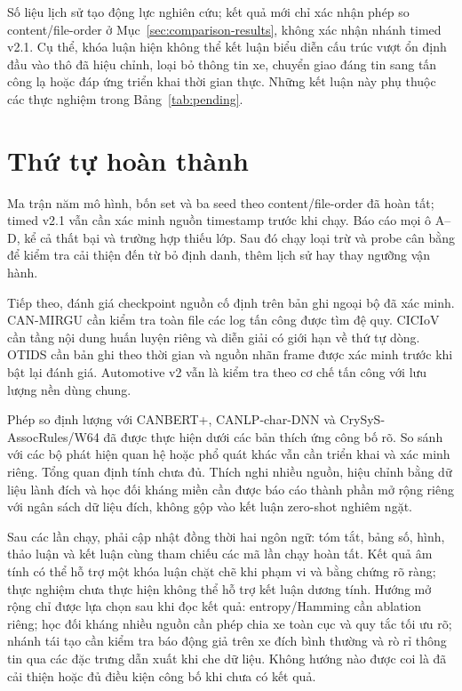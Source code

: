 \documentclass[12pt,a4paper,oneside,openany]{extbook}
\begin{document}
Số liệu lịch sử tạo động lực nghiên cứu; kết quả mới chỉ xác nhận phép so content/file-order ở Mục~\ref{sec:comparison-results}, không xác nhận nhánh timed v2.1. Cụ thể, khóa luận hiện không thể kết luận biểu diễn cấu trúc vượt ổn định đầu vào thô đã hiệu chỉnh, loại bỏ thông tin xe, chuyển giao đáng tin sang tấn công lạ hoặc đáp ứng triển khai thời gian thực. Những kết luận này phụ thuộc các thực nghiệm trong Bảng~\ref{tab:pending}.

\section{Thứ tự hoàn thành}
Ma trận năm mô hình, bốn set và ba seed theo content/file-order đã hoàn tất; timed v2.1 vẫn cần xác minh nguồn timestamp trước khi chạy. Báo cáo mọi ô A--D, kể cả thất bại và trường hợp thiếu lớp. Sau đó chạy loại trừ và probe cân bằng để kiểm tra cải thiện đến từ bỏ định danh, thêm lịch sử hay thay ngưỡng vận hành.

Tiếp theo, đánh giá checkpoint nguồn cố định trên bản ghi ngoại bộ đã xác minh. CAN-MIRGU cần kiểm tra toàn file các log tấn công được tìm đệ quy. CICIoV cần tầng nội dung huấn luyện riêng và diễn giải có giới hạn về thứ tự dòng. OTIDS cần bản ghi theo thời gian và nguồn nhãn frame được xác minh trước khi bật lại đánh giá. Automotive v2 vẫn là kiểm tra theo cơ chế tấn công với lưu lượng nền dùng chung.

Phép so định lượng với CANBERT+, CANLP-char-DNN và CrySyS-AssocRules/W64 đã được thực hiện dưới các bản thích ứng công bố rõ. So sánh với các bộ phát hiện quan hệ hoặc phổ quát khác vẫn cần triển khai và xác minh riêng. Tổng quan định tính chưa đủ. Thích nghi nhiều nguồn, hiệu chỉnh bằng dữ liệu lành đích và học đối kháng miền cần được báo cáo thành phần mở rộng riêng với ngân sách dữ liệu đích, không gộp vào kết luận zero-shot nghiêm ngặt.

Sau các lần chạy, phải cập nhật đồng thời hai ngôn ngữ: tóm tắt, bảng số, hình, thảo luận và kết luận cùng tham chiếu các mã lần chạy hoàn tất. Kết quả âm tính có thể hỗ trợ một khóa luận chặt chẽ khi phạm vi và bằng chứng rõ ràng; thực nghiệm chưa thực hiện không thể hỗ trợ kết luận dương tính.
Hướng mở rộng chỉ được lựa chọn sau khi đọc kết quả: entropy/Hamming cần ablation riêng; học đối kháng nhiều nguồn cần phép chia xe toàn cục và quy tắc tối ưu rõ; nhánh tái tạo cần kiểm tra báo động giả trên xe đích bình thường và rò rỉ thông tin qua các đặc trưng dẫn xuất khi che dữ liệu. Không hướng nào được coi là đã cải thiện hoặc đủ điều kiện công bố khi chưa có kết quả.
\end{document}
